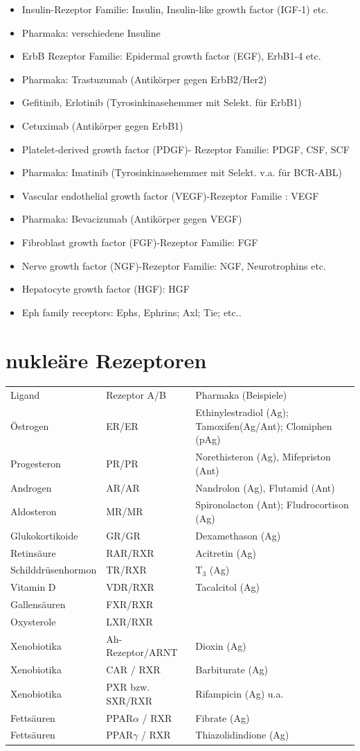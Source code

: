 \documentclass[10pt,a4paper]{report}
\begin{document}
\begin{itemize}
	\item Insulin-Rezeptor Familie:  Insulin, Insulin-like growth factor (IGF-1) etc.
	\item Pharmaka: verschiedene Insuline
	\item ErbB Rezeptor Familie: Epidermal growth factor (EGF), ErbB1-4 etc.
	\item Pharmaka: Trastuzumab (Antikörper gegen ErbB2/Her2)
	\item Gefitinib, Erlotinib (Tyrosinkinasehemmer mit Selekt. für ErbB1)
	\item Cetuximab (Antikörper gegen ErbB1)
	\item Platelet-derived growth factor (PDGF)- Rezeptor Familie: PDGF, CSF, SCF
	\item Pharmaka: Imatinib (Tyrosinkinasehemmer mit Selekt. v.a. für BCR-ABL) 
	\item Vascular endothelial growth factor (VEGF)-Rezeptor Familie : VEGF
	\item Pharmaka: Bevacizumab (Antikörper gegen VEGF)
	\item Fibroblast growth factor (FGF)-Rezeptor Familie: FGF 
	\item Nerve growth factor (NGF)-Rezeptor Familie: NGF, Neurotrophins etc.
	\item Hepatocyte growth factor (HGF): HGF 
	\item Eph family receptors: Ephs, Ephrins;   Axl; Tie; etc..
\end{itemize}

\section{nukleäre Rezeptoren}
\begin{tabularx}{\textwidth}{XXX}
Ligand&Rezeptor A/B&Pharmaka (Beispiele)\\
Östrogen&ER/ER&Ethinylestradiol (Ag); Tamoxifen(Ag/Ant); Clomiphen (pAg)\\
Progesteron&PR/PR&Norethisteron (Ag), Mifepriston (Ant)\\
Androgen&AR/AR&Nandrolon (Ag), Flutamid (Ant)\\
Aldosteron&MR/MR&Spironolacton (Ant); Fludrocortison (Ag)\\
Glukokortikoide&GR/GR&Dexamethason (Ag)\\
Retinsäure&RAR/RXR&Acitretin (Ag)\\		
Schilddrüsenhormon&TR/RXR&T$_3$ (Ag)\\
Vitamin D&VDR/RXR&Tacalcitol (Ag)\\
Gallensäuren&FXR/RXR&\\
Oxysterole&LXR/RXR&\\
Xenobiotika&Ah-Rezeptor/ARNT&Dioxin (Ag)\\
Xenobiotika&CAR / RXR&Barbiturate (Ag)\\
Xenobiotika&PXR bzw. SXR/RXR&Rifampicin (Ag) u.a.\\	
Fettsäuren&PPAR$\alpha$ / RXR&Fibrate (Ag)\\
Fettsäuren&PPAR$\gamma$ / RXR&Thiazolidindione (Ag)\\
\end{tabularx}
\end{document}
